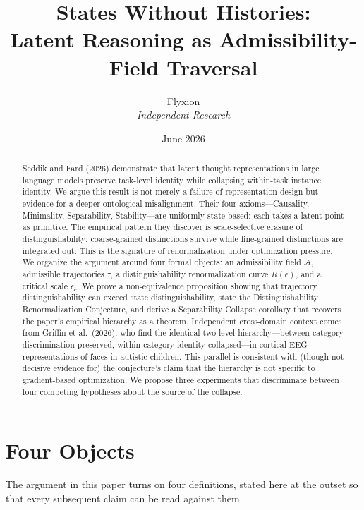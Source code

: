 \documentclass[11pt]{article}
\title{\textbf{States Without Histories:\\
Latent Reasoning as Admissibility-Field Traversal}}
\author{Flyxion\\
\textit{Independent Research}}
\date{June 2026}
\begin{document}
\maketitle

\begin{abstract}
Seddik and Fard (2026) demonstrate that latent thought representations in large language models
preserve task-level identity while collapsing within-task instance identity. We argue this result
is not merely a failure of representation design but evidence for a deeper ontological
misalignment. Their four axioms---Causality, Minimality, Separability, Stability---are uniformly
state-based: each takes a latent point as primitive. The empirical pattern they discover is
scale-selective erasure of distinguishability: coarse-grained distinctions survive while
fine-grained distinctions are integrated out. This is the signature of renormalization under
optimization pressure. We organize the argument around four formal objects: an admissibility
field $\mathcal{A}$, admissible trajectories $\tau$, a distinguishability renormalization curve
$R(\epsilon)$, and a critical scale $\epsilon_c$. We prove a non-equivalence proposition showing
that trajectory distinguishability can exceed state distinguishability, state the Distinguishability
Renormalization Conjecture, and derive a Separability Collapse corollary that recovers the paper's
empirical hierarchy as a theorem. Independent cross-domain context comes from Griffin et al.\
(2026), who find the identical two-level hierarchy---between-category discrimination preserved,
within-category identity collapsed---in cortical EEG representations of faces in autistic
children. This parallel is consistent with (though not decisive evidence for) the conjecture's
claim that the hierarchy is not specific to gradient-based optimization. We propose three experiments that discriminate between four competing hypotheses
about the source of the collapse.
\end{abstract}

\newpage

\section{Four Objects}

The argument in this paper turns on four definitions, stated here at the outset so that every
subsequent claim can be read against them.
\end{document}
